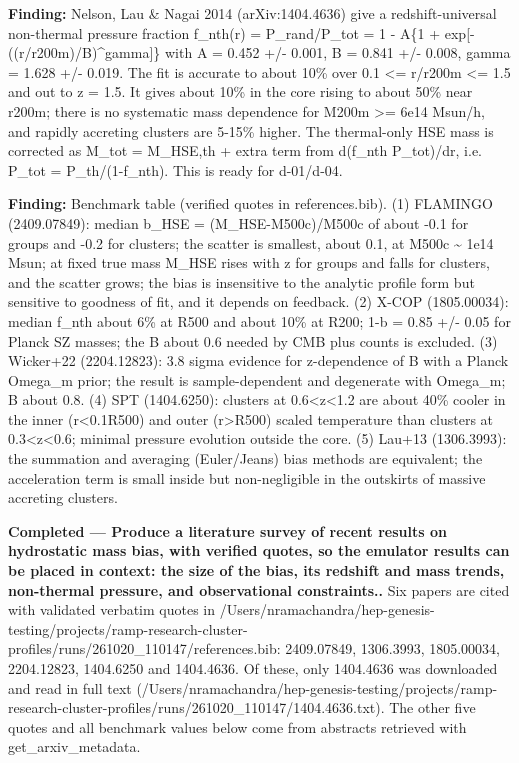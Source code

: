 \documentclass[11pt,a4paper]{article}
\begin{document}
\textbf{Finding:} Nelson, Lau \& Nagai 2014 (arXiv:1404.4636) give a redshift-universal non-thermal pressure fraction f\_nth(r) = P\_rand/P\_tot = 1 - A\{1 + exp[-((r/r200m)/B)\textasciicircum{}gamma]\} with A = 0.452 +/- 0.001, B = 0.841 +/- 0.008, gamma = 1.628 +/- 0.019. The fit is accurate to about 10\% over 0.1 \textless{}= r/r200m \textless{}= 1.5 and out to z = 1.5. It gives about 10\% in the core rising to about 50\% near r200m; there is no systematic mass dependence for M200m \textgreater{}= 6e14 Msun/h, and rapidly accreting clusters are 5-15\% higher. The thermal-only HSE mass is corrected as M\_tot = M\_HSE,th + extra term from d(f\_nth P\_tot)/dr, i.e. P\_tot = P\_th/(1-f\_nth). This is ready for d-01/d-04.

\textbf{Finding:} Benchmark table (verified quotes in references.bib). (1) FLAMINGO (2409.07849): median b\_HSE = (M\_HSE-M500c)/M500c of about -0.1 for groups and -0.2 for clusters; the scatter is smallest, about 0.1, at M500c \textasciitilde{} 1e14 Msun; at fixed true mass M\_HSE rises with z for groups and falls for clusters, and the scatter grows; the bias is insensitive to the analytic profile form but sensitive to goodness of fit, and it depends on feedback. (2) X-COP (1805.00034): median f\_nth about 6\% at R500 and about 10\% at R200; 1-b = 0.85 +/- 0.05 for Planck SZ masses; the B about 0.6 needed by CMB plus counts is excluded. (3) Wicker+22 (2204.12823): 3.8 sigma evidence for z-dependence of B with a Planck Omega\_m prior; the result is sample-dependent and degenerate with Omega\_m; B about 0.8. (4) SPT (1404.6250): clusters at 0.6\textless{}z\textless{}1.2 are about 40\% cooler in the inner (r\textless{}0.1R500) and outer (r\textgreater{}R500) scaled temperature than clusters at 0.3\textless{}z\textless{}0.6; minimal pressure evolution outside the core. (5) Lau+13 (1306.3993): the summation and averaging (Euler/Jeans) bias methods are equivalent; the acceleration term is small inside but non-negligible in the outskirts of massive accreting clusters.

\textbf{Completed --- Produce a literature survey of recent results on hydrostatic mass bias, with verified quotes, so the emulator results can be placed in context: the size of the bias, its redshift and mass trends, non-thermal pressure, and observational constraints..} Six papers are cited with validated verbatim quotes in /Users/nramachandra/hep-genesis-testing/projects/ramp-research-cluster-profiles/runs/261020\_110147/references.bib: 2409.07849, 1306.3993, 1805.00034, 2204.12823, 1404.6250 and 1404.4636. Of these, only 1404.4636 was downloaded and read in full text (/Users/nramachandra/hep-genesis-testing/projects/ramp-research-cluster-profiles/runs/261020\_110147/1404.4636.txt). The other five quotes and all benchmark values below come from abstracts retrieved with get\_arxiv\_metadata.
\end{document}
